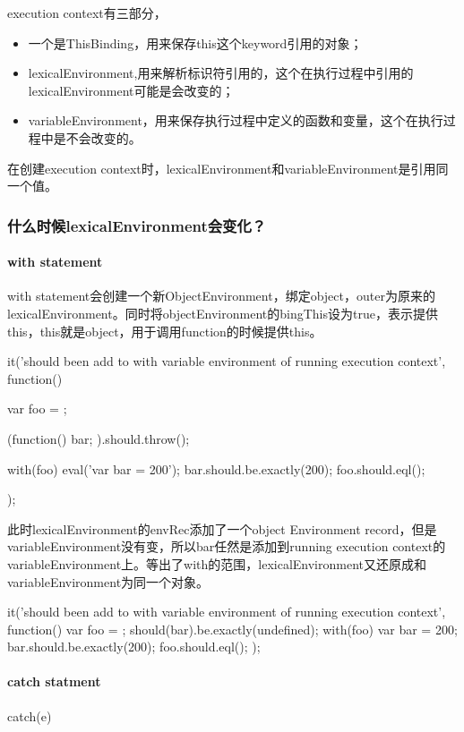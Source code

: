 execution context有三部分，
\begin{itemize}
\item 一个是ThisBinding，用来保存this这个keyword引用的对象；
\item lexicalEnvironment,用来解析标识符引用的，这个在执行过程中引用的lexicalEnvironment可能是会改变的；
\item variableEnvironment，用来保存执行过程中定义的函数和变量，这个在执行过程中是不会改变的。
\end{itemize}
在创建execution context时，lexicalEnvironment和variableEnvironment是引用同一个值。

\subsubsection{什么时候lexicalEnvironment会变化？}
\paragraph{with statement}
with statement会创建一个新ObjectEnvironment，绑定object，outer为原来的lexicalEnvironment。同时将objectEnvironment的bingThis设为true，表示提供this，this就是object，用于调用function的时候提供this。
\begin{JavaScript}
		it('should been add to with variable environment of running execution context', function(){
			var foo = {};

			(function(){
				bar;
			}).should.throw();
			
			with(foo){
				eval('var bar = 200');
			}
			bar.should.be.exactly(200);
			foo.should.eql({});
		});
\end{JavaScript}

此时lexicalEnvironment的envRec添加了一个object Environment record，但是variableEnvironment没有变，所以bar任然是添加到running execution context的variableEnvironment上。等出了with的范围，lexicalEnvironment又还原成和variableEnvironment为同一个对象。
\begin{JavaScript}
		it('should been add to with variable environment of running execution context', function(){
			var foo = {};
			should(bar).be.exactly(undefined);
			with(foo){
				var bar = 200;
			}
			bar.should.be.exactly(200);
			foo.should.eql({});
		});
\end{JavaScript}

\paragraph{catch statment}
catch(e)

